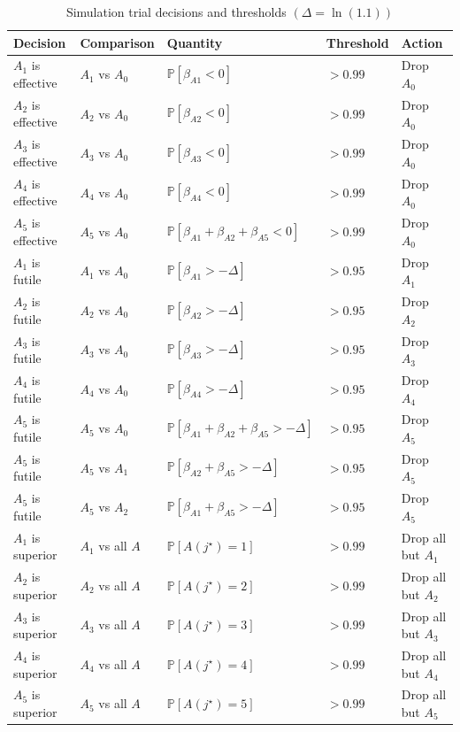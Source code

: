 \documentclass[
]{article}
\begin{document}
\begin{table}[H]

\caption{\label{tab:simdectab}Simulation trial decisions and thresholds $(\Delta = \ln(1.1))$}
\centering
\begin{tabular}[t]{lllll}
\toprule
Decision & Comparison & Quantity & Threshold & Action\\
\midrule
$A_1$ is effective & $A_1$ vs $A_0$ & $\mathbb P[\beta_{A1}<0]$ & $>0.99$ & Drop $A_0$\\
$A_2$ is effective & $A_2$ vs $A_0$ & $\mathbb P[\beta_{A2}<0]$ & $>0.99$ & Drop $A_0$\\
$A_3$ is effective & $A_3$ vs $A_0$ & $\mathbb P[\beta_{A3}<0]$ & $>0.99$ & Drop $A_0$\\
$A_4$ is effective & $A_4$ vs $A_0$ & $\mathbb P[\beta_{A4}<0]$ & $>0.99$ & Drop $A_0$\\
$A_5$ is effective & $A_5$ vs $A_0$ & $\mathbb P[\beta_{A1}+\beta_{A2}+\beta_{A5}<0]$ & $>0.99$ & Drop $A_0$\\
$A_1$ is futile & $A_1$ vs $A_0$ & $\mathbb P[\beta_{A1}>-\Delta]$ & $>0.95$ & Drop $A_1$\\
$A_2$ is futile & $A_2$ vs $A_0$ & $\mathbb P[\beta_{A2}>-\Delta]$ & $>0.95$ & Drop $A_2$\\
$A_3$ is futile & $A_3$ vs $A_0$ & $\mathbb P[\beta_{A3}>-\Delta]$ & $>0.95$ & Drop $A_3$\\
$A_4$ is futile & $A_4$ vs $A_0$ & $\mathbb P[\beta_{A4}>-\Delta]$ & $>0.95$ & Drop $A_4$\\
$A_5$ is futile & $A_5$ vs $A_0$ & $\mathbb P[\beta_{A1}+\beta_{A2}+\beta_{A5}>-\Delta]$ & $>0.95$ & Drop $A_5$\\
$A_5$ is futile & $A_5$ vs $A_1$ & $\mathbb P[\beta_{A2}+\beta_{A5}>-\Delta]$ & $>0.95$ & Drop $A_5$\\
$A_5$ is futile & $A_5$ vs $A_2$ & $\mathbb P[\beta_{A1}+\beta_{A5}>-\Delta]$ & $>0.95$ & Drop $A_5$\\
$A_1$ is superior & $A_1$ vs all $A$ & $\mathbb P[A(j^\star)=1]$ & $>0.99$ & Drop all but $A_1$\\
$A_2$ is superior & $A_2$ vs all $A$ & $\mathbb P[A(j^\star)=2]$ & $>0.99$ & Drop all but $A_2$\\
$A_3$ is superior & $A_3$ vs all $A$ & $\mathbb P[A(j^\star)=3]$ & $>0.99$ & Drop all but $A_3$\\
$A_4$ is superior & $A_4$ vs all $A$ & $\mathbb P[A(j^\star)=4]$ & $>0.99$ & Drop all but $A_4$\\
$A_5$ is superior & $A_5$ vs all $A$ & $\mathbb P[A(j^\star)=5]$ & $>0.99$ & Drop all but $A_5$\\

\end{tabular}
\end{table}
\end{document}
